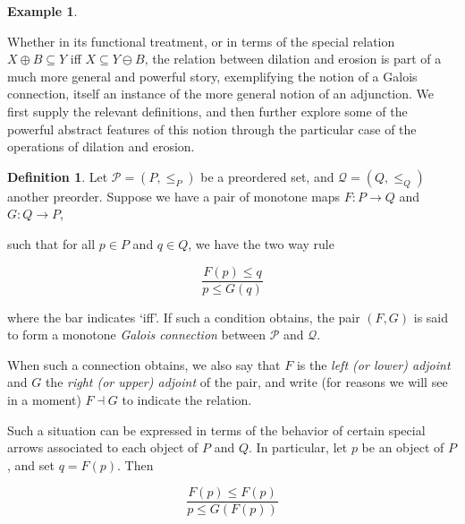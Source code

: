 \documentclass[a4paper]{book}
\theoremstyle{definition}
\newtheorem{example}{Example}[section]
\theoremstyle{definition}
\newtheorem{definition}{Definition}[section]
\theoremstyle{definition}
\theoremstyle{theorem}
\theoremstyle{definition}
\begin{document}
\begin{example}
\begin{center}
\end{center}
Whether in its functional treatment, or in terms of the special relation $X \oplus B \subseteq  Y$ iff $X \subseteq  Y \ominus B$, the relation between dilation and erosion is part of a much more general and powerful story, exemplifying the notion of a Galois connection, itself an instance of the more general notion of an adjunction. We first supply the relevant definitions, and then further explore some of the powerful abstract features of this notion through the particular case of the operations of dilation and erosion. 
\begin{definition} 
Let $\mathcal{P} = (P, \leq_P)$ be a preordered set, and $\mathcal{Q} = (Q, \leq_Q)$ another preorder. Suppose we have a pair of monotone maps $F: P \rightarrow Q$ and $G: Q \rightarrow P$, 
\begin{center}  
\end{center} 
such that for all $p \in P$ and $q \in Q$, we have the two way rule 
\begin{center} 
	\begin{equation*}
	\frac{F(p) \leq q}{p \leq G(q)}
	\end{equation*}
\end{center} 
where the bar indicates `iff'. If such a condition obtains, the pair $(F, G)$ is said to form a monotone \textit{Galois connection} between $\mathcal{P}$ and $\mathcal{Q}$. 
\end{definition} \noindent 
When such a connection obtains, we also say that $F$ is the \textit{left (or lower) adjoint} and $G$ the \textit{right (or upper) adjoint} of the pair, and write (for reasons we will see in a moment) $F \dashv G$ to indicate the relation. \par 
Such a situation can be expressed in terms of the behavior of certain special arrows associated to each object of $P$ and $Q$. In particular, let $p$ be an object of $P$, and set $q = F(p)$. Then 
\begin{center} 
	\begin{equation*}
	\frac{F(p) \leq F(p)}{p \leq G(F(p))}
	\end{equation*}
\end{center} 

\end{example}
\end{document}
